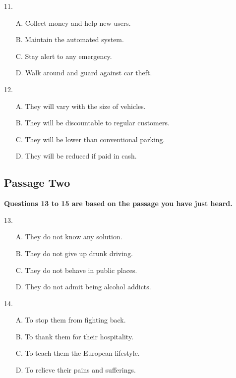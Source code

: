 \documentclass[UTF8,11pt]{ctexart}
\begin{document}
11.


\begin{itemize}[leftmargin=2em,itemsep=.2em,topsep=.4em]\item[A.] Collect money and help new users.
\item[B.] Maintain the automated system.
\item[C.] Stay alert to any emergency.
\item[D.] Walk around and guard against car theft.
\end{itemize}

12.


\begin{itemize}[leftmargin=2em,itemsep=.2em,topsep=.4em]\item[A.] They will vary with the size of vehicles.
\item[B.] They will be discountable to regular customers.
\item[C.] They will be lower than conventional parking.
\item[D.] They will be reduced if paid in cash.
\end{itemize}

\subsection*{\textbf{Passage Two}}


\textbf{Questions 13 to 15 are based on the passage you have just heard.}


13.


\begin{itemize}[leftmargin=2em,itemsep=.2em,topsep=.4em]\item[A.] They do not know any solution.
\item[B.] They do not give up drunk driving.
\item[C.] They do not behave in public places.
\item[D.] They do not admit being alcohol addicts.
\end{itemize}

14.


\begin{itemize}[leftmargin=2em,itemsep=.2em,topsep=.4em]\item[A.] To stop them from fighting back.
\item[B.] To thank them for their hospitality.
\item[C.] To teach them the European lifestyle.
\item[D.] To relieve their pains and sufferings.
\end{itemize}
\end{document}
